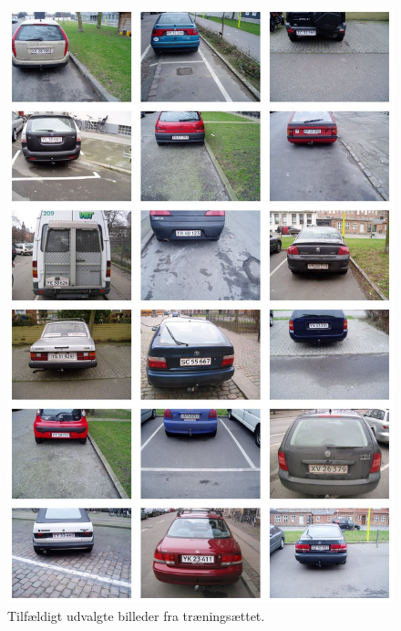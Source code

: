 \documentclass[11pt,a4paper,final]{article}
\begin{document}



\begin{figure}[htp]
\centering
\includegraphics[width=12cm]{appendix/illu/trainingset.jpg} 
\caption{Tilfældigt udvalgte billeder fra træningsættet.}
\label{fig:illu:trainingset}
\end{figure}
\end{document}
